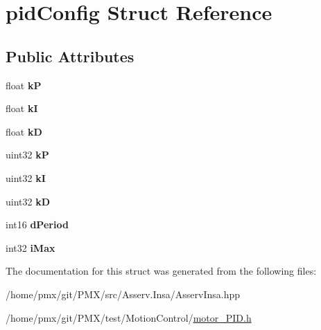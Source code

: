 \hypertarget{structpidConfig}{}\section{pid\+Config Struct Reference}
\label{structpidConfig}
\subsection*{Public Attributes}
\begin{DoxyCompactItemize}
\item 
\mbox{\label{structpidConfig_a45e555fd2d81d9d64a6d2acff6255bda}} 
float {\bfseries kP}
\item 
\mbox{\label{structpidConfig_a346fe2170d6af936f2fa3990db4bd7d2}} 
float {\bfseries kI}
\item 
\mbox{\label{structpidConfig_a33332e389df67d2cfefcdea639ea3c07}} 
float {\bfseries kD}
\item 
\mbox{\label{structpidConfig_aba2744c45d17a111a7484d929c94e43a}} 
uint32 {\bfseries kP}
\item 
\mbox{\label{structpidConfig_a9470650596d8cf1c5790dfba56daee01}} 
uint32 {\bfseries kI}
\item 
\mbox{\label{structpidConfig_a133b1c8703e23331018645ec72c7f8dd}} 
uint32 {\bfseries kD}
\item 
\mbox{\label{structpidConfig_af1bf42e8ec1a93a3b95774f04bab5b0a}} 
int16 {\bfseries d\+Period}
\item 
\mbox{\label{structpidConfig_a1cbeae4e8c3f327a1ce6698155e3b8ff}} 
int32 {\bfseries i\+Max}
\end{DoxyCompactItemize}


The documentation for this struct was generated from the following files\+:\begin{DoxyCompactItemize}
\item 
/home/pmx/git/\+P\+M\+X/src/\+Asserv.\+Insa/Asserv\+Insa.\+hpp\item 
/home/pmx/git/\+P\+M\+X/test/\+Motion\+Control/\hyperlink{motor__PID_8h}{motor\+\_\+\+P\+I\+D.\+h}\end{DoxyCompactItemize}
